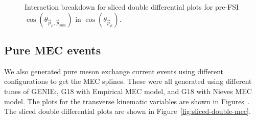 \documentclass{article}
\newcommand{\vm}{\vec{p}_\mu}
\newcommand{\vtp}{\vec{p}_{\text{sum}}}
\begin{document}
\begin{figure}
    \caption{Interaction breakdown for sliced double differential plots for pre-FSI $\cos(\theta_{\vm,\vtp})$ in $\cos(\theta_{\vec{p}_{\mu}})$.}
    \label{fig:inte-breakdown-double-cos-opening-angle-muon-total-proton-no-fsi}
\end{figure}

\clearpage

\subsection{Pure MEC events}

We also generated pure meson exchange current events using different configurations to get the MEC splines. 
These were all generated using different tunes of GENIE:, G18 with Empirical MEC model, and G18 with Nieves MEC model. 
The plots for the transverse kinematic variables are shown in Figures~. 
The sliced double differential plots are shown in Figure~\ref{fig:sliced-double-mec}.
\end{document}
